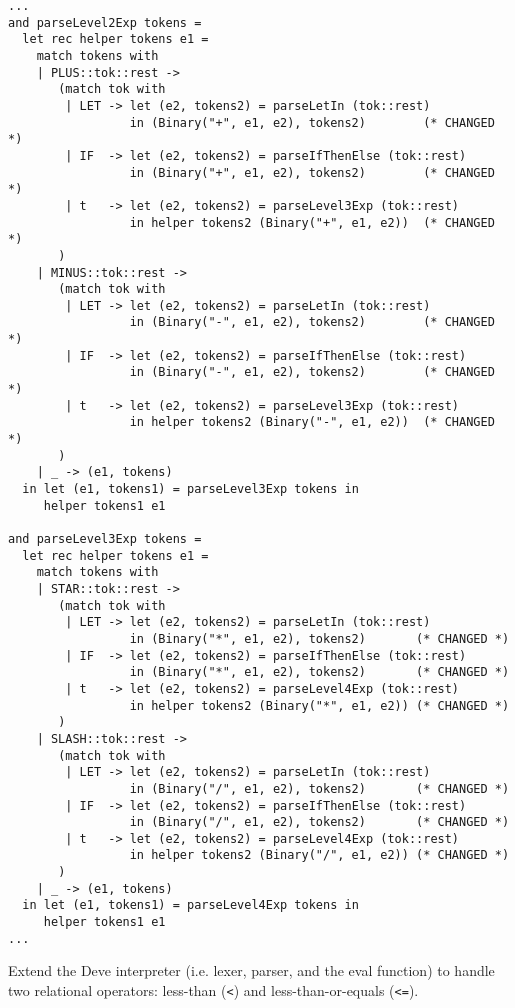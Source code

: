 \documentclass[addpoints]{exam}
\begin{document}
\begin{questions}
\begin{solution}
    {\small
    \begin{verbatim}
...
and parseLevel2Exp tokens =
  let rec helper tokens e1 =
    match tokens with
    | PLUS::tok::rest ->
       (match tok with
        | LET -> let (e2, tokens2) = parseLetIn (tok::rest)
                 in (Binary("+", e1, e2), tokens2)        (* CHANGED *)
        | IF  -> let (e2, tokens2) = parseIfThenElse (tok::rest)
                 in (Binary("+", e1, e2), tokens2)        (* CHANGED *)
        | t   -> let (e2, tokens2) = parseLevel3Exp (tok::rest)
                 in helper tokens2 (Binary("+", e1, e2))  (* CHANGED *)
       )
    | MINUS::tok::rest ->
       (match tok with
        | LET -> let (e2, tokens2) = parseLetIn (tok::rest)
                 in (Binary("-", e1, e2), tokens2)        (* CHANGED *)
        | IF  -> let (e2, tokens2) = parseIfThenElse (tok::rest)
                 in (Binary("-", e1, e2), tokens2)        (* CHANGED *)
        | t   -> let (e2, tokens2) = parseLevel3Exp (tok::rest)
                 in helper tokens2 (Binary("-", e1, e2))  (* CHANGED *)
       )
    | _ -> (e1, tokens)
  in let (e1, tokens1) = parseLevel3Exp tokens in
     helper tokens1 e1

and parseLevel3Exp tokens =
  let rec helper tokens e1 =
    match tokens with
    | STAR::tok::rest ->
       (match tok with
        | LET -> let (e2, tokens2) = parseLetIn (tok::rest)
                 in (Binary("*", e1, e2), tokens2)       (* CHANGED *)
        | IF  -> let (e2, tokens2) = parseIfThenElse (tok::rest)
                 in (Binary("*", e1, e2), tokens2)       (* CHANGED *)
        | t   -> let (e2, tokens2) = parseLevel4Exp (tok::rest)
                 in helper tokens2 (Binary("*", e1, e2)) (* CHANGED *)
       )
    | SLASH::tok::rest ->
       (match tok with
        | LET -> let (e2, tokens2) = parseLetIn (tok::rest)
                 in (Binary("/", e1, e2), tokens2)       (* CHANGED *)
        | IF  -> let (e2, tokens2) = parseIfThenElse (tok::rest)
                 in (Binary("/", e1, e2), tokens2)       (* CHANGED *)
        | t   -> let (e2, tokens2) = parseLevel4Exp (tok::rest)
                 in helper tokens2 (Binary("/", e1, e2)) (* CHANGED *)
       )
    | _ -> (e1, tokens)
  in let (e1, tokens1) = parseLevel4Exp tokens in
     helper tokens1 e1
...
    \end{verbatim}
    }
  \end{solution}
  
  \question
  Extend the Deve interpreter (i.e. lexer, parser, and the
  eval function) to handle two relational operators:
  less-than (\texttt{<}) and less-than-or-equals
  (\texttt{<=}).


\end{questions}
\end{document}

